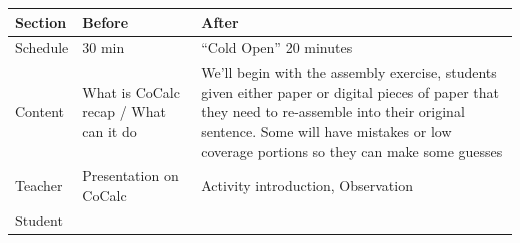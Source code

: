 \documentclass[paper=a4,justified,a4paper]{tufte-handout}
\begin{document}
\begin{longtable}[]{@{}lll@{}}
\toprule
\begin{minipage}[b]{0.21\columnwidth}\raggedright
Section\strut
\end{minipage} & \begin{minipage}[b]{0.28\columnwidth}\raggedright
Before\strut
\end{minipage} & \begin{minipage}[b]{0.42\columnwidth}\raggedright
After\strut
\end{minipage}\tabularnewline
\midrule
\endhead
\begin{minipage}[t]{0.21\columnwidth}\raggedright
Schedule\strut
\end{minipage} & \begin{minipage}[t]{0.28\columnwidth}\raggedright
30 min\strut
\end{minipage} & \begin{minipage}[t]{0.42\columnwidth}\raggedright
``Cold Open'' 20 minutes\strut
\end{minipage}\tabularnewline
\begin{minipage}[t]{0.21\columnwidth}\raggedright
Content\strut
\end{minipage} & \begin{minipage}[t]{0.28\columnwidth}\raggedright
What is CoCalc recap / What can it do\strut
\end{minipage} & \begin{minipage}[t]{0.42\columnwidth}\raggedright
We'll begin with the assembly exercise, students given either paper or
digital pieces of paper that they need to re-assemble into their
original sentence. Some will have mistakes or low coverage portions so
they can make some guesses\strut
\end{minipage}\tabularnewline
\begin{minipage}[t]{0.21\columnwidth}\raggedright
Teacher\strut
\end{minipage} & \begin{minipage}[t]{0.28\columnwidth}\raggedright
Presentation on CoCalc\strut
\end{minipage} & \begin{minipage}[t]{0.42\columnwidth}\raggedright
Activity introduction, Observation\strut
\end{minipage}\tabularnewline
\begin{minipage}[t]{0.21\columnwidth}\raggedright
Student\strut
\end{minipage} & \begin{minipage}[t]{0.28\columnwidth}\raggedright

\end{minipage}
\end{longtable}
\end{document}
